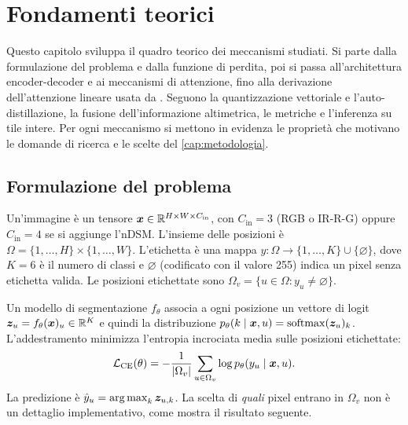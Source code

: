 \chapter{Fondamenti teorici}
\label{cap:teoria}

Questo capitolo sviluppa il quadro teorico dei meccanismi studiati. Si parte dalla formulazione
del problema e dalla funzione di perdita, poi si passa all'architettura encoder-decoder e ai
meccanismi di attenzione, fino alla derivazione dell'attenzione lineare usata da \maresunet{}.
Seguono la quantizzazione vettoriale e l'auto-distillazione, la fusione dell'informazione
altimetrica, le metriche e l'inferenza su tile intere. Per ogni meccanismo si mettono in
evidenza le proprietà che motivano le domande di ricerca e le scelte del
\cref{cap:metodologia}.

\section{Formulazione del problema}
\label{sec:formulazione}

Un'immagine è un tensore $\bm{x}\in\mathbb{R}^{H\times W\times C_{\mathrm{in}}}$, con $C_{\mathrm{in}}=3$
(RGB o IR-R-G) oppure $C_{\mathrm{in}}=4$ se si aggiunge l'nDSM. L'insieme delle posizioni è
$\Omega=\{1,\dots,H\}\times\{1,\dots,W\}$. L'etichetta è una mappa
$y:\Omega\to\{1,\dots,K\}\cup\{\varnothing\}$, dove $K=6$ è il numero di classi e
$\varnothing$ (codificato con il valore 255) indica un pixel senza etichetta valida. Le
posizioni etichettate sono $\Omega_v=\{u\in\Omega : y_u\neq\varnothing\}$.

Un modello di segmentazione $f_\theta$ associa a ogni posizione un vettore di logit
$\bm{z}_u=f_\theta(\bm{x})_u\in\mathbb{R}^K$ e quindi la distribuzione
$p_\theta(k\mid\bm{x},u)=\operatorname{softmax}(\bm{z}_u)_k$. L'addestramento minimizza l'entropia
incrociata media sulle posizioni etichettate:
\begin{equation}
  \mathcal{L}_{\mathrm{CE}}(\theta)
  = -\frac{1}{\left\lvert \Omega_v \right\rvert}\sum_{u\in\Omega_v}\log p_\theta(y_u\mid\bm{x},u).
  \label{eq:ce-mascherata}
\end{equation}
La predizione è $\hat y_u=\operatorname*{arg\,max}_k \bm{z}_{u,k}$. La scelta di \emph{quali} pixel entrano in
$\Omega_v$ non è un dettaglio implementativo, come mostra il risultato seguente.


